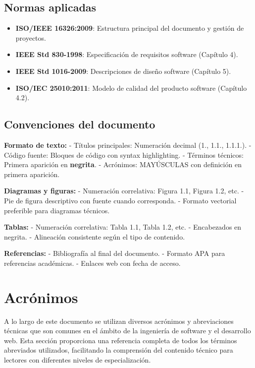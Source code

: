 \documentclass[12pt,a4paper,oneside]{report}
\providecommand{\tightlist}{%
  \setlength{\itemsep}{0pt}\setlength{\parskip}{0pt}}
\begin{document}
\subsection{Normas aplicadas}\label{normas-aplicadas}

\begin{itemize}
\tightlist
\item
  \textbf{ISO/IEEE 16326:2009}: Estructura principal del documento y
  gestión de proyectos.
\item
  \textbf{IEEE Std 830-1998}: Especificación de requisitos software
  (Capítulo 4).
\item
  \textbf{IEEE Std 1016-2009}: Descripciones de diseño software
  (Capítulo 5).
\item
  \textbf{ISO/IEC 25010:2011}: Modelo de calidad del producto software
  (Capítulo 4.2).
\end{itemize}

\subsection{Convenciones del
documento}\label{convenciones-del-documento}

\textbf{Formato de texto:} - Títulos principales: Numeración decimal
(1., 1.1., 1.1.1.). - Código fuente: Bloques de código con syntax
highlighting. - Términos técnicos: Primera aparición en
\textbf{negrita}. - Acrónimos: MAYÚSCULAS con definición en primera
aparición.

\textbf{Diagramas y figuras:} - Numeración correlativa: Figura 1.1,
Figura 1.2, etc. - Pie de figura descriptivo con fuente cuando
corresponda. - Formato vectorial preferible para diagramas técnicos.

\textbf{Tablas:} - Numeración correlativa: Tabla 1.1, Tabla 1.2, etc. -
Encabezados en negrita. - Alineación consistente según el tipo de
contenido.

\textbf{Referencias:} - Bibliografía al final del documento. - Formato
APA para referencias académicas. - Enlaces web con fecha de acceso.

\section{Acrónimos}\label{acruxf3nimos}

A lo largo de este documento se utilizan diversos acrónimos y
abreviaciones técnicas que son comunes en el ámbito de la ingeniería de
software y el desarrollo web. Esta sección proporciona una referencia
completa de todos los términos abreviados utilizados, facilitando la
comprensión del contenido técnico para lectores con diferentes niveles
de especialización.
\end{document}
